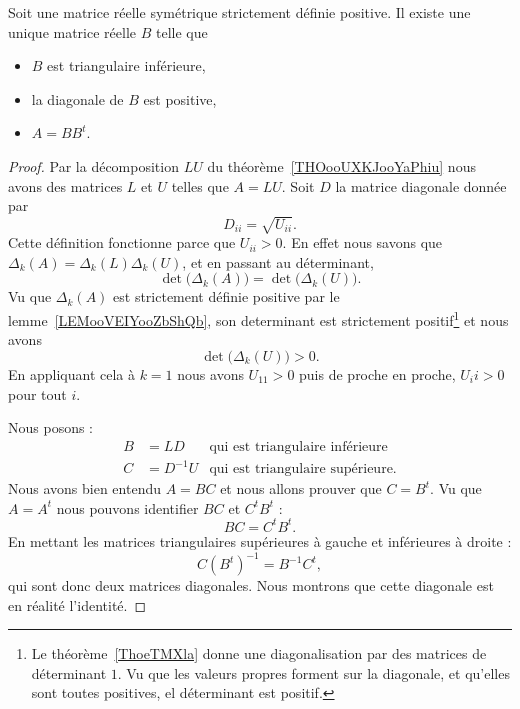 \begin{theorem}
	Soit une matrice réelle symétrique strictement définie positive. Il existe une unique matrice réelle \( B\) telle que
	\begin{itemize}
		\item \( B\) est triangulaire inférieure,
		\item la diagonale de \( B\) est positive,
		\item \( A=BB^t\).
	\end{itemize}
\end{theorem}

\begin{proof}
	Par la décomposition \( LU\) du théorème~\ref{THOooUXKJooYaPhiu} nous avons des matrices \( L\) et \( U\) telles que \( A=LU\). Soit \( D\) la matrice diagonale donnée par
	\begin{equation}
		D_{ii}=\sqrt{ U_{ii} }.
	\end{equation}
	Cette définition fonctionne parce que \( U_{ii}>0\). En effet nous savons que \( \Delta_k(A)=\Delta_k(L)\Delta_k(U)\), et en passant au déterminant,
	\begin{equation}
		\det\big( \Delta_k(A) \big)=\det\big( \Delta_k(U) \big).
	\end{equation}
	Vu que \( \Delta_k(A)\) est strictement définie positive par le lemme~\ref{LEMooVEIYooZbShQb}, son determinant est strictement positif\footnote{Le théorème~\ref{ThoeTMXla} donne une diagonalisation par des matrices de déterminant \( 1\). Vu que les valeurs propres forment sur la diagonale, et qu'elles sont toutes positives, el déterminant est positif.} et nous avons
	\begin{equation}
		\det\big( \Delta_k(U) \big)>0.
	\end{equation}
	En appliquant cela à \( k=1\) nous avons \( U_{11}>0\) puis de proche en proche, \( U_ii>0\) pour tout \( i\).

	Nous posons :
	\begin{subequations}
		\begin{align}
			B & =LD       & \text{qui est triangulaire inférieure}  \\
			C & =D^{-1} U & \text{qui est triangulaire supérieure.}
		\end{align}
	\end{subequations}
	Nous avons bien entendu \( A=BC\) et nous allons prouver que \( C=B^t\). Vu que \( A=A^t\) nous pouvons identifier \( BC\) et \( C^tB^t\) :
	\begin{equation}
		BC=C^tB^t.
	\end{equation}
	En mettant les matrices triangulaires supérieures à gauche et inférieures à droite :
	\begin{equation}
		C(B^t)^{-1}=B^{-1}C^t,
	\end{equation}
	qui sont donc deux matrices diagonales. Nous montrons que cette diagonale est en réalité l'identité.


\end{proof}
